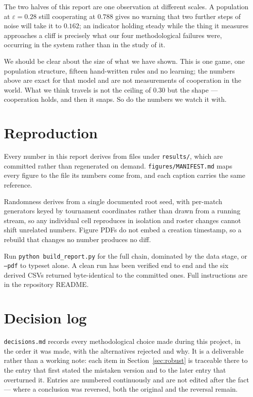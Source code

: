 \documentclass[11pt,a4paper]{article}
\newcommand{\eps}{\varepsilon}
\begin{document}
The two halves of this report are one observation at different scales. A
population at $\eps = 0.28$ still cooperating at $0.788$ gives no warning that two
further steps of noise will take it to $0.162$; an indicator holding steady while
the thing it measures approaches a cliff is precisely what our four methodological
failures were, occurring in the system rather than in the study of it.

We should be clear about the size of what we have shown. This is one game, one
population structure, fifteen hand-written rules and no learning; the numbers
above are exact for that model and are not measurements of cooperation in the
world. What we think travels is not the ceiling of $0.30$ but the shape ---
cooperation holds, and then it snaps. So do the numbers we watch it with.

\appendix

\section{Reproduction}
\label{sec:repro}

Every number in this report derives from files under \texttt{results/}, which
are committed rather than regenerated on demand.
\texttt{figures/MANIFEST.md} maps every figure to the file its numbers come
from, and each caption carries the same reference.

Randomness derives from a single documented root seed, with per-match generators
keyed by tournament coordinates rather than drawn from a running stream, so any
individual cell reproduces in isolation and roster changes cannot shift unrelated
numbers. Figure PDFs do not embed a creation timestamp, so a rebuild that changes
no number produces no diff.

Run \texttt{python build\_report.py} for the full chain, dominated by the data
stage, or \texttt{--pdf} to typeset alone. A clean run has been verified end to
end and the six derived CSVs returned byte-identical to the committed ones. Full
instructions are in the repository README.

\section{Decision log}
\label{sec:decisions}

\texttt{decisions.md} records every methodological choice made during this
project, in the order it was made, with the alternatives rejected and why. It is
a deliverable rather than a working note: each item in
Section~\ref{sec:robust} is traceable there to the entry that first stated the
mistaken version and to the later entry that overturned it. Entries are numbered
continuously and are not edited after the fact --- where a conclusion was
reversed, both the original and the reversal remain.



\end{document}
